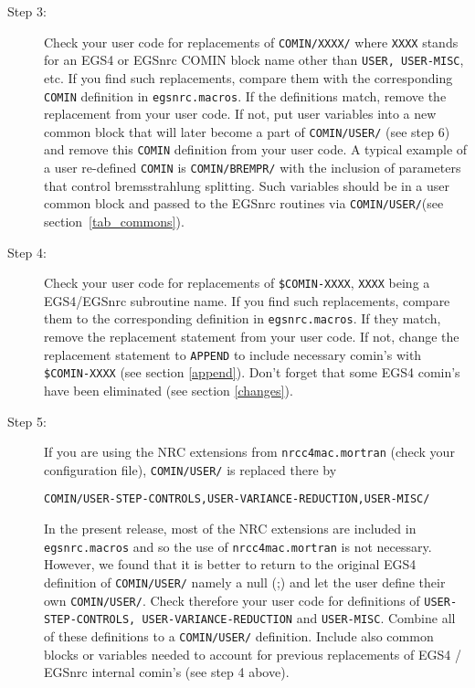 \begin{description}
\item[Step 3:]
Check your user code for replacements of {\tt COMIN/XXXX/} 
where {\tt XXXX} stands for an EGS4 or EGSnrc COMIN block name other than 
{\tt USER, USER-MISC}, etc. If you find such replacements, 
compare them with the corresponding {\tt COMIN} definition 
in {\tt egsnrc.macros}. If the definitions match, remove 
the replacement from your user code. If not, put user variables 
into a new common block that will later become a part of 
{\tt COMIN/USER/} (see step 6) and remove this {\tt COMIN} 
definition from your user code. A typical example of a user re-defined 
{\tt COMIN} is {\tt COMIN/BREMPR/} with the inclusion of parameters 
that control bremsstrahlung splitting. Such variables should be 
in a user common block and passed to the EGSnrc routines via 
{\tt COMIN/USER/}(see section~\ref{tab_commons}).

\item[Step 4:]
Check your user code for replacements of {\tt \$COMIN-XXXX}, 
{\tt XXXX} being a EGS4/EGSnrc subroutine name. If you find such 
replacements, compare them to the corresponding definition 
in {\tt egsnrc.macros}. If they match, remove the replacement 
statement from your user code. If not, change the replacement 
statement to {\tt APPEND} to include necessary comin's 
with {\tt \$COMIN-XXXX} (see section \ref{append}). Don't forget 
that some EGS4 comin's have been eliminated (see section \ref{changes}). 

\item[Step 5:]
If you are using the NRC extensions from {\tt nrcc4mac.mortran} 
(check your configuration file), {\tt COMIN/USER/} is 
replaced there by 
\begin{flushleft}
{\tt COMIN/USER-STEP-CONTROLS,USER-VARIANCE-REDUCTION,USER-MISC/}\\
\end{flushleft}
In the present release, most of the NRC extensions are included 
in {\tt egsnrc.macros} and so the use of {\tt nrcc4mac.mortran} is 
not necessary. However, we found that it is better to return 
to the original EGS4 definition of {\tt COMIN/USER/} namely a null (;)
and let the user define their own {\tt COMIN/USER/}. 
Check therefore your user code for definitions of 
{\tt USER-STEP-CONTROLS, USER-VARIANCE-REDUCTION} and 
{\tt USER-MISC}. Combine all of these definitions to a  {\tt COMIN/USER/} 
definition. Include also common blocks or variables needed to account for
previous replacements of
EGS4 / EGSnrc internal comin's (see step 4 above).


\end{description}
